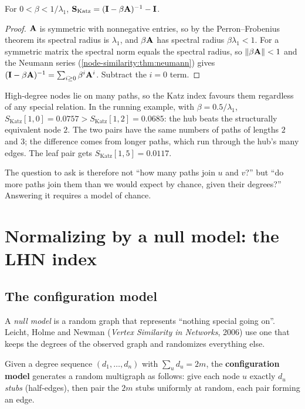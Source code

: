\begin{notechapter}
\begin{theorem}\label{node-similarity:thm:katz-closed}
For $0 < \beta < 1/\lambda_1$, $\mathbf{S}_{\text{Katz}} = (\mathbf{I} - \beta\mathbf{A})^{-1} - \mathbf{I}$.
\end{theorem}

\begin{proof}
$\mathbf{A}$ is symmetric with nonnegative entries, so by the Perron--Frobenius theorem its spectral radius is $\lambda_1$, and $\beta\mathbf{A}$ has spectral radius $\beta\lambda_1 < 1$. For a symmetric matrix the spectral norm equals the spectral radius, so $\left\|\beta\mathbf{A}\right\| < 1$ and the Neumann series (\cref{node-similarity:thm:neumann}) gives $(\mathbf{I} - \beta\mathbf{A})^{-1} = \sum_{i\ge0}\beta^i\mathbf{A}^i$. Subtract the $i = 0$ term.
\end{proof}

\begin{pitfall}
High-degree nodes lie on many paths, so the Katz index favours them regardless of any special relation. In the running example, with $\beta = 0.5/\lambda_1$, $S_{\text{Katz}}[1,0] = 0.0757 > S_{\text{Katz}}[1,2] = 0.0685$: the hub beats the structurally equivalent node $2$. The two pairs have the same numbers of paths of lengths $2$ and $3$; the difference comes from longer paths, which run through the hub's many edges. The leaf pair gets $S_{\text{Katz}}[1,5] = 0.0117$.
\end{pitfall}

The question to ask is therefore not ``how many paths join $u$ and $v$?'' but ``do more paths join them than we would expect by chance, given their degrees?'' Answering it requires a model of chance.

\section{Normalizing by a null model: the LHN index}

\subsection{The configuration model}

A \emph{null model} is a random graph that represents ``nothing special going on''. Leicht, Holme and Newman (\emph{Vertex Similarity in Networks}, 2006) use one that keeps the degrees of the observed graph and randomizes everything else.

\begin{definition}\label{node-similarity:def:configuration}
Given a degree sequence $(d_1, \ldots, d_n)$ with $\sum_u d_u = 2m$, the \textbf{configuration model} generates a random multigraph as follows: give each node $u$ exactly $d_u$ \emph{stubs} (half-edges), then pair the $2m$ stubs uniformly at random, each pair forming an edge.
\end{definition}


\end{notechapter}

